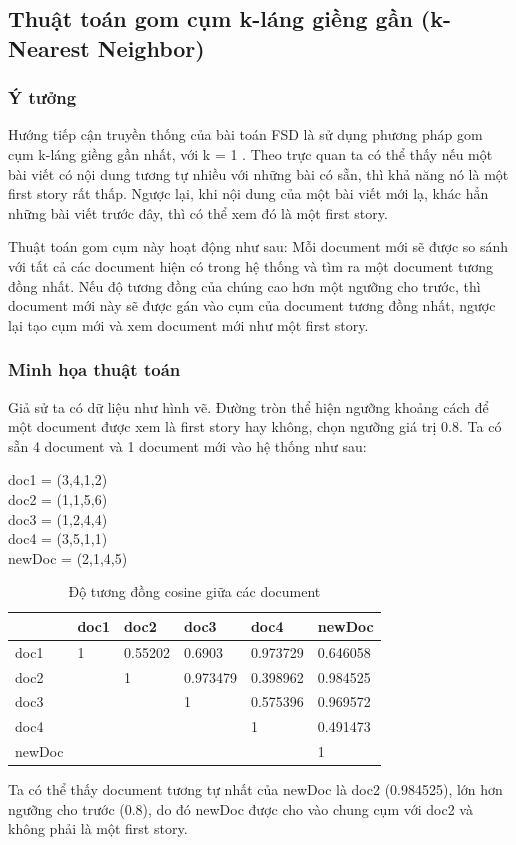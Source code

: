 \subsection{Thuật toán gom cụm k-láng giềng gần (k-Nearest Neighbor)}
	\subsubsection{Ý tưởng}
		Hướng tiếp cận truyền thống của bài toán FSD là sử dụng phương pháp gom cụm k-láng giềng gần nhất, với k = 1 \cite{Allan00detectionsbounds}. Theo trực quan ta có thể thấy nếu một bài viết có nội dung tương tự nhiều với những bài có sẵn, thì khả năng nó là một first story rất thấp. Ngược lại, khi nội dung của một bài viết mới lạ, khác hẳn những bài viết trước đây, thì có thể xem đó là một first story.
		
		Thuật toán gom cụm này hoạt động như sau: Mỗi document mới sẽ được so sánh với tất cả các document hiện có trong hệ thống và tìm ra một document tương đồng nhất. Nếu độ tương đồng của chúng cao hơn một ngưỡng cho trước, thì document mới này sẽ được gán vào cụm của document tương đồng nhất, ngược lại tạo cụm mới và xem document mới như một first story.
		
	\subsubsection{Minh họa thuật toán}
		Giả sử ta có dữ liệu như hình vẽ. Đường tròn thể hiện ngưỡng khoảng cách để một document được xem là first story hay không, chọn ngưỡng giá trị 0.8. Ta có sẵn 4 document và 1 document mới vào hệ thống như sau:
		\begin{center}
					doc1 = (3,4,1,2)\\
				doc2 = (1,1,5,6)\\
				doc3 = (1,2,4,4)\\
				doc4 = (3,5,1,1)\\
				newDoc = (2,1,4,5)\\
		\end{center}
		\begin{table}[H]
			\centering
			\begin{tabular}{|p{1.5cm}|p{1.5cm}|p{1.5cm}|p{1.5cm}|p{1.5cm}|p{1.5cm}|}
				\hline
				& doc1 & doc2 & doc3 & doc4 & \textbf{newDoc} \\
				\hline 
				doc1 & 1 & 0.55202 & 0.6903 	& 0.973729 & 0.646058 \\
				doc2 &   & 1 		& 0.973479 	& 0.398962 & 0.984525 \\
				doc3 &   &   		& 1			& 0.575396 & 0.969572 \\
				doc4 &   &  		&  			& 1 	& 0.491473 \\
				newDoc &   &  		&  			&   	& 1 \\
				\hline
			\end{tabular}
			\caption{Độ tương đồng cosine giữa các document} \label{tab:table_1_1}
		
		\end{table}
		Ta có thể thấy document tương tự nhất của newDoc là doc2 (0.984525), lớn hơn ngưỡng cho trước (0.8), do đó newDoc được cho vào chung cụm với doc2 và không phải là một first story.
	
